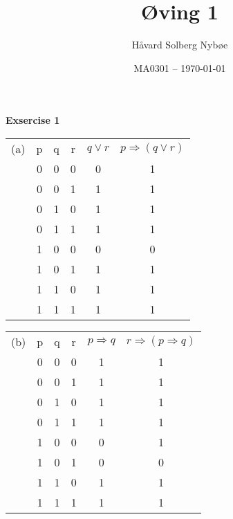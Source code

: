 \documentclass[a4paper, 12pt]{article}  %
\title{Øving 1}                         %
\author{Håvard Solberg Nybøe}           %
\date{MA0301 -- \today}                 %
\begin{document}
\maketitle

\textbf{Exsercise 1} 
\begin{table}[H]
    \begin{tabular}[H]{c|c|c|c|c|c|}
        (a) & p & q & r & $q \lor r$ & $p \Rightarrow (q \lor r)$ \\
            & 0 & 0 & 0 &     0      &            1            \\
            & 0 & 0 & 1 &     1      &            1            \\
            & 0 & 1 & 0 &     1      &            1            \\
            & 0 & 1 & 1 &     1      &            1            \\
            & 1 & 0 & 0 &     0      &            0            \\
            & 1 & 0 & 1 &     1      &            1            \\
            & 1 & 1 & 0 &     1      &            1            \\
            & 1 & 1 & 1 &     1      &            1            \\

    \end{tabular}
\end{table}

\begin{table}[H]
    \begin{tabular}[H]{c|c|c|c|c|c|}
        (b) & p & q & r & $p \Rightarrow q$ & $r \Rightarrow (p \Rightarrow q)$ \\
            & 0 & 0 & 0 &        1          &                 1                 \\
            & 0 & 0 & 1 &        1          &                 1                 \\
            & 0 & 1 & 0 &        1          &                 1                 \\
            & 0 & 1 & 1 &        1          &                 1                 \\
            & 1 & 0 & 0 &        0          &                 1                 \\
            & 1 & 0 & 1 &        0          &                 0                 \\
            & 1 & 1 & 0 &        1          &                 1                 \\
            & 1 & 1 & 1 &        1          &                 1                 \\

    \end{tabular}
\end{table}
\end{document}
